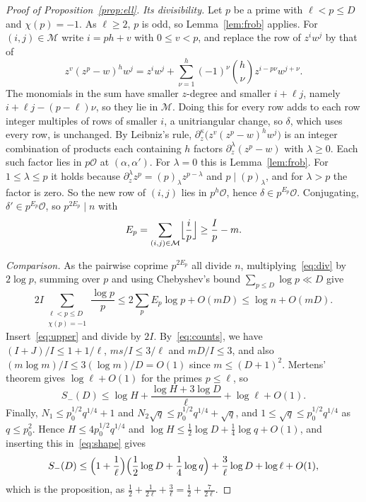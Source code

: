 \documentclass[11pt]{amsart}
\theoremstyle{remark}
\newcommand{\cO}{\mathcal{O}}
\newcommand{\cM}{\mathcal{M}}
\begin{document}
\begin{proof}[Proof of Proposition~\ref{prop:ell}]
\emph{Its divisibility.} Let $p$ be a prime with $\ell<p\le D$ and $\chi(p)=-1$. As $\ell\ge2$, $p$ is
odd, so Lemma~\ref{lem:frob} applies. For $(i,j)\in\cM$ write $i=ph+v$ with $0\le v<p$, and replace
the row of $z^iw^j$ by that of
\[
z^v(z^p-w)^hw^j=z^iw^j+\sum_{\nu=1}^{h}(-1)^\nu\binom h\nu z^{i-p\nu}w^{j+\nu}.
\]
The monomials in the sum have smaller $z$-degree and smaller $i+\ell j$, namely $i+\ell j-(p-\ell)\nu$, so they
lie in $\cM$. Doing this for every
row adds to each row integer multiples of rows of smaller $i$, a unitriangular change, so $\delta$,
which uses every row, is unchanged. By Leibniz's rule,
$\partial_z^\kappa\bigl(z^v(z^p-w)^hw^j\bigr)$ is an integer combination of products each containing
$h$ factors $\partial_z^\lambda(z^p-w)$ with $\lambda\ge0$. Each such factor lies in $p\cO$ at
$(\alpha,\alpha')$. For $\lambda=0$ this is Lemma~\ref{lem:frob}. For $1\le\lambda\le p$ it holds because
$\partial_z^\lambda z^p=(p)_\lambda z^{p-\lambda}$ and $p\mid(p)_\lambda$, and for $\lambda>p$ the factor is
zero. So the new row of $(i,j)$ lies in $p^h\cO$, hence $\delta\in p^{E_p}\cO$. Conjugating,
$\delta'\in p^{E_p}\cO$, so $p^{2E_p}\mid n$ with
\begin{equation}\label{eq:div}
E_p=\sum_{(i,j)\in\cM}\Bigl\lfloor\frac ip\Bigr\rfloor\ge\frac Ip-m.
\end{equation}

\emph{Comparison.} As the pairwise coprime $p^{2E_p}$ all divide $n$, multiplying~\eqref{eq:div}
by $2\log p$, summing over $p$ and using Chebyshev's bound $\sum_{p\le D}\log p\ll D$ give
\[
2I\sum_{\substack{\ell<p\le D\\ \chi(p)=-1}}\frac{\log p}p\le2\sum_pE_p\log p+O(mD)\le\log n+O(mD).
\]
Insert~\eqref{eq:upper} and divide by $2I$. By~\eqref{eq:counts}, we have
$(I+J)/I\le1+1/\ell$, $ms/I\le3/\ell$ and $mD/I\le3$, and also $(m\log m)/I\le3(\log m)/D=O(1)$ since
$m\le(D+1)^2$. Mertens'
theorem gives $\log\ell+O(1)$ for the primes $p\le\ell$, so
\begin{equation}\label{eq:shape}
S_-(D)\le\log H+\frac{\log H+3\log D}\ell+\log\ell+O(1).
\end{equation}
Finally, $N_1\le p_0^{1/2}q^{1/4}+1$ and
$N_2\sqrt q\le p_0^{1/2}q^{1/4}+\sqrt q$, and $1\le\sqrt q\le p_0^{1/2}q^{1/4}$ as $q\le p_0^2$.
Hence $H\le4p_0^{1/2}q^{1/4}$ and $\log H\le\frac12\log D+\frac14\log q+O(1)$, and
inserting this in~\eqref{eq:shape} gives
\[
S_-(D)\le\Bigl(1+\frac1\ell\Bigr)\Bigl(\frac12\log D+\frac14\log q\Bigr)+\frac3\ell\log D+\log\ell+O(1),
\]
which is the proposition, as $\frac12+\frac1{2\ell}+\frac3\ell=\frac12+\frac7{2\ell}$.
\end{proof}
\end{document}
